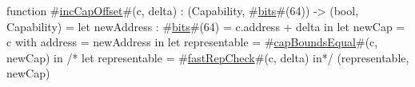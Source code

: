 function #\hyperref[sailMIPSzincCapOffset]{incCapOffset}#(c, delta) : (Capability, #\hyperref[sailMIPSzbits]{bits}#(64)) -> (bool, Capability) =
    let newAddress : #\hyperref[sailMIPSzbits]{bits}#(64) = c.address + delta in
    let newCap     = { c with address = newAddress } in
    let representable = #\hyperref[sailMIPSzcapBoundsEqual]{capBoundsEqual}#(c, newCap) in
/*    let representable = #\hyperref[sailMIPSzfastRepCheck]{fastRepCheck}#(c, delta) in*/
    (representable, newCap)
